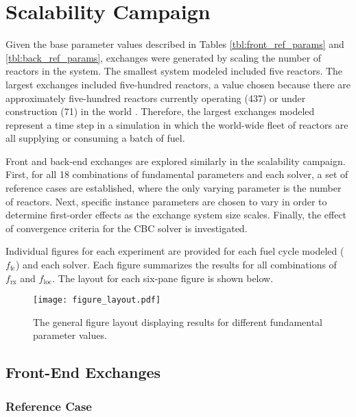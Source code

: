 
\section{Scalability Campaign}\label{results:scale}

Given the base parameter values described in Tables \ref{tbl:front_ref_params}
and \ref{tbl:back_ref_params}, exchanges were generated by scaling the number of
reactors in the system. The smallest system modeled included five reactors. The
largest exchanges included five-hundred reactors, a value chosen because there
are approximately five-hundred reactors currently operating (437) or under
construction (71) in the world \cite{nrxtrs}. Therefore, the largest exchanges
modeled represent a time step in a simulation in which the world-wide fleet of
reactors are all supplying or consuming a batch of fuel.

Front and back-end exchanges are explored similarly in the scalability
campaign. First, for all 18 combinations of fundamental parameters and each
solver, a set of reference cases are established, where the only varying
parameter is the number of reactors. Next, specific instance parameters are
chosen to vary in order to determine first-order effects as the exchange system
size scales. Finally, the effect of convergence criteria for the CBC solver is
investigated.

Individual figures for each experiment are provided for each fuel cycle modeled
($f_\text{fc}$) and each solver. Each figure summarizes the results for all
combinations of $f_\text{rx}$ and $f_\text{loc}$. The layout for each six-pane
figure is shown below.

\begin{figure}[h!]
  \begin{center}
    \texttt{[image: figure\_layout.pdf]}
    \caption[]{
      \label{fig:figure_layout}
      The general figure layout displaying results for different fundamental
      parameter values.}
  \end{center}
\end{figure}

\subsection{Front-End Exchanges}

\subsubsection{Reference Case}

